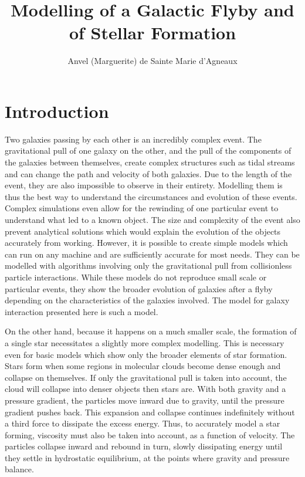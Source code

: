 \documentclass[a4paper,12pt]{article}
\title{Modelling of a Galactic Flyby and of Stellar Formation}
\author{Anvel (Marguerite) de Sainte Marie d'Agneaux}
\date{}
\begin{document}
\maketitle


\section{Introduction}\label{sec:intro}

Two galaxies passing by each other is an incredibly complex event. The gravitational pull of one galaxy on the other, and the pull of the components of the galaxies between themselves, create complex structures such as tidal streams and can change the path and velocity of both galaxies. Due to the length of the event, they are also impossible to observe in their entirety. Modelling them is thus the best way to understand the circumstances and evolution of these events. Complex simulations even allow for the rewinding of one particular event to understand what led to a known object. The size and complexity of the event also prevent analytical solutions which would explain the evolution of the objects accurately from working. However, it is possible to create simple models which can run on any machine and are sufficiently accurate for most needs. They can be modelled with algorithms involving only the gravitational pull from collisionless particle interactions. While these models do not reproduce small scale or particular events, they show the broader evolution of galaxies after a flyby depending on the characteristics of the galaxies involved. The model for galaxy interaction presented here is such a model.


On the other hand, because it happens on a much smaller scale, the formation of a single star necessitates a slightly more complex modelling. This is necessary even for basic models which show only the broader elements of star formation. Stars form when some regions in molecular clouds become dense enough and collapse on themselves. If only the gravitational pull is taken into account, the cloud will collapse into denser objects then stars are. With both gravity and a pressure gradient, the particles move inward due to gravity, until the pressure gradient pushes back. This expansion and collapse continues indefinitely without a third force to dissipate the excess energy. Thus, to accurately model a star forming, viscosity must also be taken into account, as a function of velocity. The particles collapse inward and rebound in turn, slowly dissipating energy until they settle in hydrostatic equilibrium, at the points where gravity and pressure balance.
\end{document}
